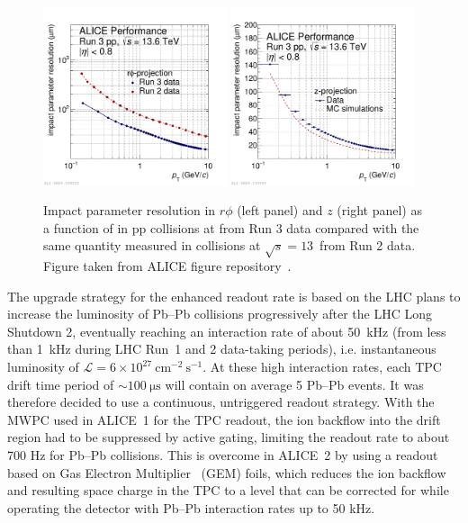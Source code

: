\begin{figure}[htb]
    \centering
    \includegraphics[width=0.48\textwidth]{Figures/Chapter 3/sigmadcaxy_run2vsrun3data_qm.pdf}
    \includegraphics[width=0.48\textwidth]{Figures/Chapter 3/sigmadcaz_lhc22q_pass2_lhcc.pdf}
    \caption{Impact parameter resolution in $r\phi$ (left panel) and $z$ (right panel) as a function of \pt in pp collisions at \thirteen from Run 3 data compared with the same quantity measured in collisions at $\sqrt{s} = 13$~\tev from Run 2 data. Figure taken from ALICE figure repository~\cite{ALICE_figures}.}
    \label{fig:ITS_res}
\end{figure}

The upgrade strategy for the enhanced readout rate is based on the LHC plans to increase the luminosity of Pb--Pb collisions progressively after the LHC Long Shutdown 2, eventually reaching an interaction rate of about 50~kHz (from less than 1~kHz during LHC Run~1 and 2 data-taking periods), i.e. instantaneous luminosity of $\mathcal{L} = 6\times10^{27}~\mathrm{cm}^{-2}~\mathrm{s}^{-1}$. At these high interaction rates, each TPC drift time period of $\sim\SI{100}{\micro\second}$ will contain on average 5 Pb--Pb events. It was therefore decided to use a continuous, untriggered readout strategy. With the MWPC used in ALICE~1 for the TPC readout, the ion backflow into the drift region had to be suppressed by active gating, limiting the readout rate to about 700 Hz for Pb--Pb collisions. This is overcome in ALICE~2 by using a readout based on Gas Electron Multiplier~\cite{Sauli:1997qp} (GEM) foils, which reduces the ion backflow and resulting space charge in the TPC to a level that can be corrected for while operating the detector with Pb--Pb interaction rates up to 50 kHz. 

